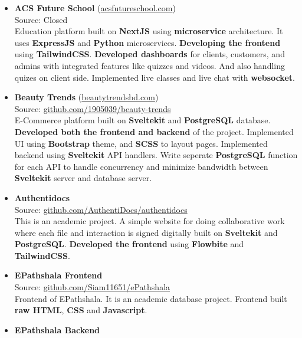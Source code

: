 
\begin{itemize}
  \item {
    \textbf{ACS Future School} (\href{https://www.acsfutureschool.com}{acsfutureschool.com}) \\
    Source: Closed \\
    Education platform built on \textbf{NextJS} using \textbf{microservice} architecture. It uses \textbf{ExpressJS} and \textbf{Python} microservices. \textbf{Developing the frontend} using \textbf{TailwindCSS}. \textbf{Developed dashboards} for clients, customers, and admins with integrated features like quizzes and videos. And also handling quizes on client side. Implemented live classes and live chat with \textbf{websocket}.
  }
  \item {
    \textbf{Beauty Trends} (\href{https://www.beautytrendsbd.com}{beautytrendsbd.com}) \\
    Source: \href{https://github.com/1905039/beauty-trends}{github.com/1905039/beauty-trends} \\
    E-Commerce platform built on \textbf{Sveltekit} and \textbf{PostgreSQL} database. \textbf{Developed both the frontend and backend} of the project. Implemented UI using \textbf{Bootstrap} theme, and \textbf{SCSS} to layout pages. Implemented backend using \textbf{Sveltekit} API handlers. Write seperate \textbf{PostgreSQL} function for each API to handle concurrency and minimize bandwidth between \textbf{Sveltekit} server and database server.
  }
  \item {
      \textbf{Authentidocs} \\
      Source: \href{https://github.com/AuthentiDocs/authentidocs}{github.com/AuthentiDocs/authentidocs} \\
      This is an academic project. A simple website for doing collaborative work where each file and interaction is signed digitally built on \textbf{Sveltekit} and \textbf{PostgreSQL}. \textbf{Developed the frontend} using \textbf{Flowbite} and \textbf{TailwindCSS}.
  }
  \item {
    \textbf{EPathshala Frontend} \\
    Source: \href{https://github.com/Siam11651/ePathshala}{github.com/Siam11651/ePathshala} \\
    Frontend of EPathshala. It is an academic database project. Frontend built \textbf{raw HTML}, \textbf{CSS} and \textbf{Javascript}.
  }
  \item {
    \textbf{EPathshala Backend} \\
}
\end{itemize}
